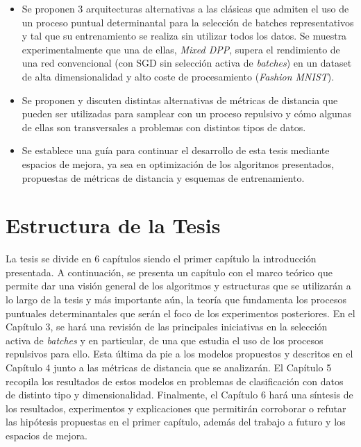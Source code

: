 \begin{itemize}
    \item Se proponen 3 arquitecturas alternativas a las clásicas que admiten el uso de un proceso puntual determinantal para la selección de batches representativos y tal que su entrenamiento se realiza sin utilizar todos los datos. Se muestra experimentalmente que una de ellas, \textit{Mixed DPP}, supera el rendimiento de una red convencional (con SGD sin selección activa de \textit{batches}) en un dataset de alta dimensionalidad y alto coste de procesamiento (\textit{Fashion MNIST}). 
 
    \item Se proponen y discuten distintas alternativas de métricas de distancia que pueden ser utilizadas para samplear con un proceso repulsivo y cómo algunas de ellas son transversales a problemas con distintos tipos de datos. 

    \item Se establece una guía para continuar el desarrollo de esta tesis mediante espacios de mejora, ya sea en optimización de los algoritmos presentados, propuestas de métricas de distancia y esquemas de entrenamiento.

\end{itemize}


\section{Estructura de la Tesis}

La tesis se divide en 6 capítulos siendo el primer capítulo la introducción presentada. A continuación, se presenta un capítulo con el marco teórico que permite dar una visión general de los algoritmos y estructuras que se utilizarán a lo largo de la tesis y más importante aún, la teoría que fundamenta los procesos puntuales determinantales que serán el foco de los experimentos posteriores. En el Capítulo 3, se hará una revisión de las principales iniciativas en la selección activa de \textit{batches} y en particular, de una que estudia el uso de los procesos repulsivos para ello. Esta última da pie a los modelos propuestos y descritos en el Capítulo 4 junto a las métricas de distancia que se analizarán. El Capítulo 5 recopila los resultados de estos modelos en problemas de clasificación con datos de distinto tipo y dimensionalidad. Finalmente, el Capítulo 6 hará una síntesis de los resultados, experimentos y explicaciones que permitirán corroborar o refutar las hipótesis propuestas en el primer capítulo, además del trabajo a futuro y los espacios de mejora. 

